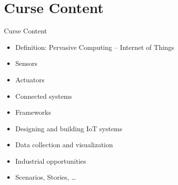 ﻿\section{Curse Content}

\begin{frame}{Curse Content}
\begin{itemize}
\item Definition: Pervasive Computing -- Internet of Things
\item Sensors
\item Actuators
\item Connected systems
\item Frameworks
\item Designing and building IoT systems
\item Data collection and visualization
\item Industrial opportunities
\item Scenarios, Stories, \ldots
\end{itemize}
\end{frame}
